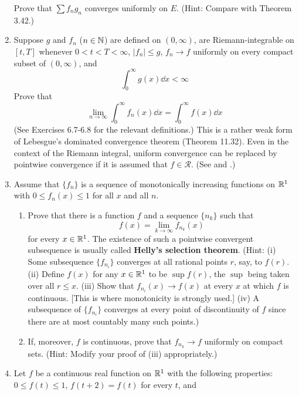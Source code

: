 \documentclass[../psets.tex]{subfiles}
\begin{document}
\begin{enumerate}[label={\textbf{\arabic*.}}]
    Prove that $\sum f_ng_n$ converges uniformly on $E$. (Hint: Compare with Theorem 3.42.)
    \item Suppose $g$ and $f_n$ ($n\in\mathbb{N}$) are defined on $(0,\infty)$, are Riemann-integrable on $[t,T]$ whenever $0<t<T<\infty$, $|f_n|\leq g$, $f_n\to f$ uniformly on every compact subset of $(0,\infty)$, and
    \begin{equation*}
        \int_0^\infty g(x)\dd{x} < \infty
    \end{equation*}
    Prove that
    \begin{equation*}
        \lim_{n\to\infty}\int_0^\infty f_n(x)\dd{x} = \int_0^\infty f(x)\dd{x}
    \end{equation*}
    (See Exercises 6.7-6.8 for the relevant definitions.) This is a rather weak form of Lebesgue's dominated convergence theorem (Theorem 11.32). Even in the context of the Riemann integral, uniform convergence can be replaced by pointwise convergence if it is assumed that $f\in\mathscr{R}$. (See \textcite{bib:Cunningham} and \textcite{bib:Kestelman}.)
    \item Assume that $\{f_n\}$ is a sequence of monotonically increasing functions on $\mathbb{R}^1$ with $0\leq f_n(x)\leq 1$ for all $x$ and all $n$.
    \begin{enumerate}
        \item Prove that there is a function $f$ and a sequence $\{n_k\}$ such that
        \begin{equation*}
            f(x) = \lim_{k\to\infty}f_{n_k}(x)
        \end{equation*}
        for every $x\in\mathbb{R}^1$. The existence of such a pointwise convergent subsequence is usually called \textbf{Helly's selection theorem}. (Hint: (i) Some subsequence $\{f_{n_i}\}$ converges at all rational points $r$, say, to $f(r)$. (ii) Define $f(x)$ for any $x\in\mathbb{R}^1$ to be $\sup f(r)$, the $\sup$ being taken over all $r\leq x$. (iii) Show that $f_{n_i}(x)\to f(x)$ at every $x$ at which $f$ is continuous. [This is where monotonicity is strongly used.] (iv) A subsequence of $\{f_{n_i}\}$ converges at every point of discontinuity of $f$ since there are at most countably many such points.)
        \item If, moreover, $f$ is continuous, prove that $f_{n_k}\to f$ uniformly on compact sets. (Hint: Modify your proof of (iii) appropriately.)
    \end{enumerate}
    \item Let $f$ be a continuous real function on $\mathbb{R}^1$ with the following properties: $0\leq f(t)\leq 1$, $f(t+2)=f(t)$ for every $t$, and

\end{enumerate}
\end{document}
